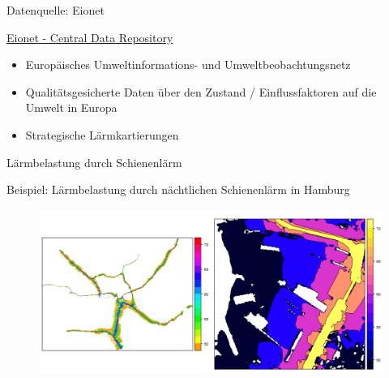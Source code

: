 \documentclass[ignorenonframetext,]{beamer}
\providecommand{\tightlist}{%
  \setlength{\itemsep}{0pt}\setlength{\parskip}{0pt}}
\begin{document}
\begin{frame}{Datenquelle: Eionet}

\begin{block}{\href{http://cdr.eionet.europa.eu/de/eu/noise/df8/colvi7k8q}{Eionet
- Central Data Repository}}

\begin{itemize}
\tightlist
\item
  Europäisches Umweltinformations- und Umweltbeobachtungsnetz
\item
  Qualitätsgesicherte Daten über den Zustand / Einflussfaktoren auf die
  Umwelt in Europa
\item
  Strategische Lärmkartierungen
\end{itemize}

\end{block}

\end{frame}

\begin{frame}{Lärmbelastung durch Schienenlärm}

\begin{block}{Beispiel: Lärmbelastung durch nächtlichen Schienenlärm in
Hamburg}

\begin{figure}
\centering
\includegraphics{figure/BSPeionet.PNG}
\caption{}
\end{figure}

\end{block}

\end{frame}
\end{document}
